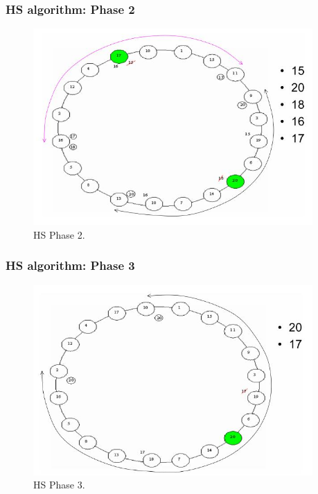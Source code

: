 \documentclass[10pt]{beamer}
\begin{document}
\begin{frame}
  \frametitle{HS algorithm: Phase 2}
  \begin{figure}
    \includegraphics[width=0.95\textwidth]{figs/hs_ex2.png}
    \caption{HS Phase 2. \cite{pedersenLeaderElectionDistributed2022}}
  \end{figure}
\end{frame}

\begin{frame}
  \frametitle{HS algorithm: Phase 3}
  \begin{figure}
    \includegraphics[width=0.95\textwidth]{figs/hs_ex3.png}
    \caption{HS Phase 3. \cite{pedersenLeaderElectionDistributed2022}}
  \end{figure}
\end{frame}
\end{document}
